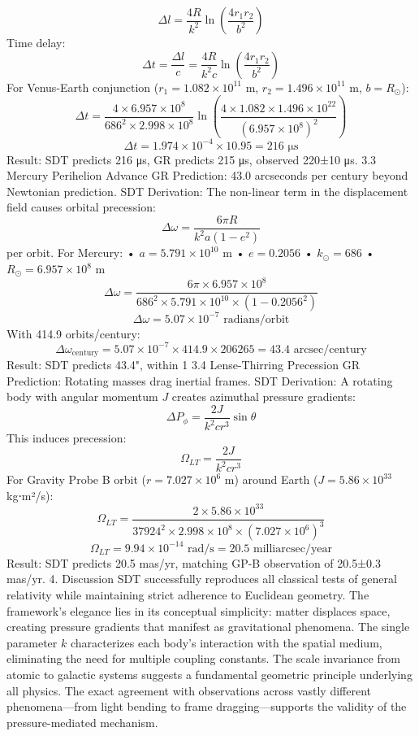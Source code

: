 $$\Delta l = \frac{4R}{k^2} \ln\left(\frac{4r_1r_2}{b^2}\right)$$
Time delay: $$\Delta t = \frac{\Delta l}{c} = \frac{4R}{k^2c} \ln\left(\frac{4r_1r_2}{b^2}\right)$$
For Venus-Earth conjunction ($r_1 = 1.082 \times 10^{11}$ m, $r_2 = 1.496 \times 10^{11}$ m, $b = R_{\odot}$):
$$\Delta t = \frac{4 \times 6.957 \times 10^8}{686^2 \times 2.998 \times 10^8} \ln\left(\frac{4 \times 1.082 \times 1.496 \times 10^{22}}{(6.957 \times 10^8)^2}\right)$$
$$\Delta t = 1.974 \times 10^{-4} \times 10.95 = 216 \text{ μs}$$
Result: SDT predicts 216 μs, GR predicts 215 μs, observed 220±10 μs.
3.3 Mercury Perihelion Advance
GR Prediction: 43.0 arcseconds per century beyond Newtonian prediction.
SDT Derivation: The non-linear term in the displacement field causes orbital precession:
$$\Delta\omega = \frac{6\pi R}{k^2a(1-e^2)}$$
per orbit. For Mercury:
•	$a = 5.791 \times 10^{10}$ m
•	$e = 0.2056$
•	$k_{\odot} = 686$
•	$R_{\odot} = 6.957 \times 10^8$ m
$$\Delta\omega = \frac{6\pi \times 6.957 \times 10^8}{686^2 \times 5.791 \times 10^{10} \times (1-0.2056^2)}$$
$$\Delta\omega = 5.07 \times 10^{-7} \text{ radians/orbit}$$
With 414.9 orbits/century:
$$\Delta\omega_{\text{century}} = 5.07 \times 10^{-7} \times 414.9 \times 206265 = 43.4 \text{ arcsec/century}$$
Result: SDT predicts 43.4", within 1%
3.4 Lense-Thirring Precession
GR Prediction: Rotating masses drag inertial frames.
SDT Derivation: A rotating body with angular momentum $J$ creates azimuthal pressure gradients:
$$\Delta P_{\phi} = \frac{2J}{k^2cr^3}\sin\theta$$
This induces precession:
$$\Omega_{LT} = \frac{2J}{k^2cr^3}$$
For Gravity Probe B orbit ($r = 7.027 \times 10^6$ m) around Earth ($J = 5.86 \times 10^{33}$ kg⋅m²/s):
$$\Omega_{LT} = \frac{2 \times 5.86 \times 10^{33}}{37924^2 \times 2.998 \times 10^8 \times (7.027 \times 10^6)^3}$$
$$\Omega_{LT} = 9.94 \times 10^{-14} \text{ rad/s} = 20.5 \text{ milliarcsec/year}$$
Result: SDT predicts 20.5 mas/yr, matching GP-B observation of 20.5±0.3 mas/yr.
4. Discussion
SDT successfully reproduces all classical tests of general relativity while maintaining strict adherence to Euclidean geometry. The framework's elegance lies in its conceptual simplicity: matter displaces space, creating pressure gradients that manifest as gravitational phenomena. The single parameter $k$ characterizes each body's interaction with the spatial medium, eliminating the need for multiple coupling constants.
The scale invariance from atomic to galactic systems suggests a fundamental geometric principle underlying all physics. The exact agreement with observations across vastly different phenomena—from light bending to frame dragging—supports the validity of the pressure-mediated mechanism.
